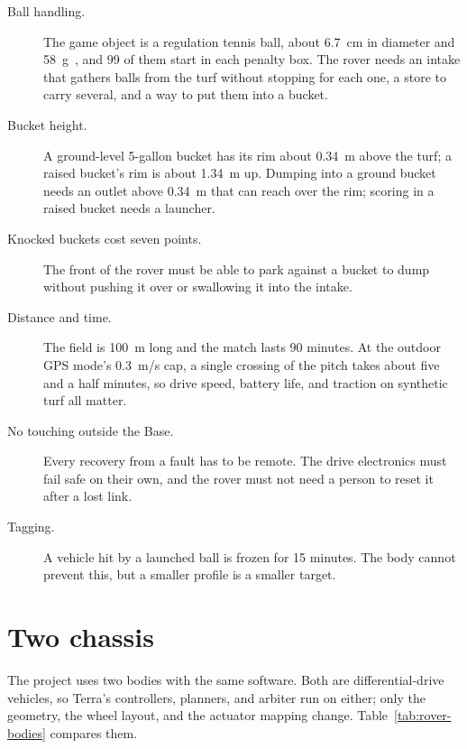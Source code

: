 \begin{description}
\item[Ball handling.] The game object is a regulation tennis ball, about 6.7~cm in diameter and 58~g~\citep{itf2026rules}, and 99 of them start in each penalty box.
  The rover needs an intake that gathers balls from the turf without stopping for each one, a store to carry several, and a way to put them into a bucket.
\item[Bucket height.] A ground-level 5-gallon bucket has its rim about 0.34~m above the turf; a raised bucket's rim is about 1.34~m up.
  Dumping into a ground bucket needs an outlet above 0.34~m that can reach over the rim; scoring in a raised bucket needs a launcher.
\item[Knocked buckets cost seven points.] The front of the rover must be able to park against a bucket to dump without pushing it over or swallowing it into the intake.
\item[Distance and time.] The field is 100~m long and the match lasts 90 minutes.
  At the outdoor GPS mode's 0.3~m/s cap, a single crossing of the pitch takes about five and a half minutes, so drive speed, battery life, and traction on synthetic turf all matter.
\item[No touching outside the Base.] Every recovery from a fault has to be remote.
  The drive electronics must fail safe on their own, and the rover must not need a person to reset it after a lost link.
\item[Tagging.] A vehicle hit by a launched ball is frozen for 15 minutes.
  The body cannot prevent this, but a smaller profile is a smaller target.
\end{description}

\section{Two chassis}
\label{sec:rover-chassis}

The project uses two bodies with the same software.
Both are differential-drive vehicles, so Terra's controllers, planners, and arbiter run on either; only the geometry, the wheel layout, and the actuator mapping change.
Table~\ref{tab:rover-bodies} compares them.

